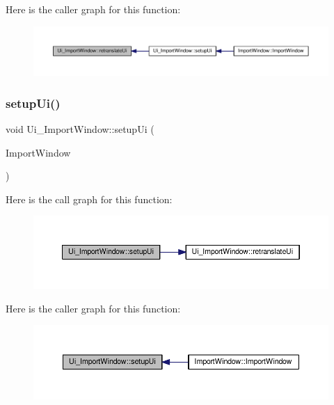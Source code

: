 Here is the caller graph for this function\+:
\nopagebreak
\begin{figure}[H]
\begin{center}
\leavevmode
\includegraphics[width=350pt]{class_ui___import_window_ac7cf23e20c202e72ed26fbb2e6b719ad_icgraph}
\end{center}
\end{figure}
\mbox{\label{class_ui___import_window_a1994d8f3faff15b4edc9a1198847c4be}} 
\subsubsection{\texorpdfstring{setup\+Ui()}{setupUi()}}
{\footnotesize\ttfamily void Ui\+\_\+\+Import\+Window\+::setup\+Ui (\begin{DoxyParamCaption}\item[{Q\+Main\+Window $\ast$}]{Import\+Window }\end{DoxyParamCaption})\hspace{0.3cm}{\ttfamily [inline]}}

Here is the call graph for this function\+:
\nopagebreak
\begin{figure}[H]
\begin{center}
\leavevmode
\includegraphics[width=350pt]{class_ui___import_window_a1994d8f3faff15b4edc9a1198847c4be_cgraph}
\end{center}
\end{figure}
Here is the caller graph for this function\+:
\nopagebreak
\begin{figure}[H]
\begin{center}
\leavevmode
\includegraphics[width=350pt]{class_ui___import_window_a1994d8f3faff15b4edc9a1198847c4be_icgraph}
\end{center}
\end{figure}


